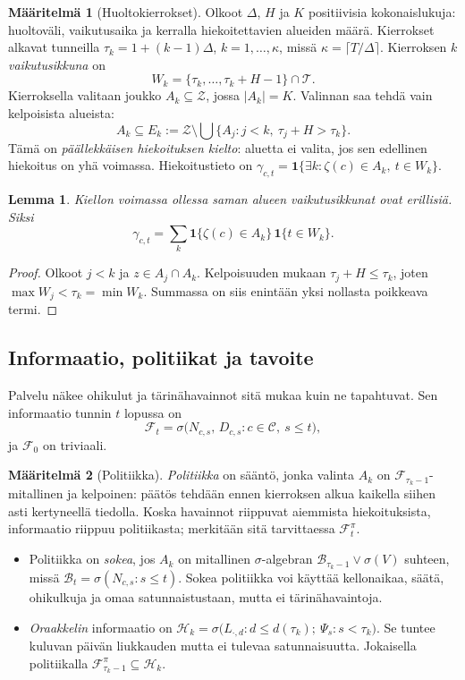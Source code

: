 \documentclass[11pt,a4paper]{article}
\theoremstyle{plain}
\newtheorem{lemma}{Lemma}
\theoremstyle{definition}
\newtheorem{maaritelma}{Määritelmä}
\theoremstyle{remark}
\newcommand{\cC}{\mathcal{C}}
\newcommand{\cZ}{\mathcal{Z}}
\newcommand{\cT}{\mathcal{T}}
\newcommand{\cF}{\mathcal{F}}
\newcommand{\cB}{\mathcal{B}}
\newcommand{\cH}{\mathcal{H}}
\newcommand{\1}{\mathbf{1}}
\begin{document}
\begin{maaritelma}[Huoltokierrokset]\label{maar:huolto}
Olkoot $\Delta$, $H$ ja $K$ positiivisia kokonaislukuja: huoltoväli,
vaikutusaika ja kerralla hiekoitettavien alueiden määrä. Kierrokset alkavat
tunneilla $\tau_k = 1 + (k-1)\Delta$, $k = 1, \dots, \kappa$, missä
$\kappa = \lceil T/\Delta \rceil$. Kierroksen $k$ \emph{vaikutusikkuna} on
\[
  W_k = \{\tau_k, \dots, \tau_k + H - 1\} \cap \cT.
\]
Kierroksella valitaan joukko $A_k \subseteq \cZ$, jossa $|A_k| = K$. Valinnan
saa tehdä vain kelpoisista alueista:
\[
  A_k \subseteq E_k := \cZ \setminus \bigcup\bigl\{A_j : j < k,\ \tau_j + H > \tau_k\bigr\}.
\]
Tämä on \emph{päällekkäisen hiekoituksen kielto}: aluetta ei valita, jos sen
edellinen hiekoitus on yhä voimassa. Hiekoitustieto on
$\gamma_{c,t} = \1\{\exists k : \zeta(c) \in A_k,\ t \in W_k\}$.
\end{maaritelma}

\begin{lemma}\label{le:erilliset}
Kiellon voimassa ollessa saman alueen vaikutusikkunat ovat erillisiä. Siksi
\[
  \gamma_{c,t} = \sum_{k} \1\{\zeta(c) \in A_k\}\, \1\{t \in W_k\}.
\]
\end{lemma}

\begin{proof}
Olkoot $j < k$ ja $z \in A_j \cap A_k$. Kelpoisuuden mukaan $\tau_j + H \le \tau_k$,
joten $\max W_j < \tau_k = \min W_k$. Summassa on siis enintään yksi nollasta
poikkeava termi.
\end{proof}

\subsection{Informaatio, politiikat ja tavoite}

Palvelu näkee ohikulut ja tärinähavainnot sitä mukaa kuin ne tapahtuvat. Sen
informaatio tunnin $t$ lopussa on
\[
  \cF_t = \sigma\bigl(N_{c,s},\, D_{c,s} : c \in \cC,\ s \le t\bigr),
\]
ja $\cF_0$ on triviaali.

\begin{maaritelma}[Politiikka]\label{maar:politiikka}
\emph{Politiikka} on sääntö, jonka valinta $A_k$ on $\cF_{\tau_k - 1}$-mitallinen
ja kelpoinen: päätös tehdään ennen kierroksen alkua kaikella siihen asti
kertyneellä tiedolla. Koska havainnot riippuvat aiemmista hiekoituksista,
informaatio riippuu politiikasta; merkitään sitä tarvittaessa $\cF^\pi_t$.
\begin{itemize}
  \item Politiikka on \emph{sokea}, jos $A_k$ on mitallinen $\sigma$-algebran
  $\cB_{\tau_k - 1} \vee \sigma(V)$ suhteen, missä
  $\cB_t = \sigma(N_{c,s} : s \le t)$. Sokea politiikka voi käyttää kellonaikaa,
  säätä, ohikulkuja ja omaa satunnaistustaan, mutta ei tärinähavaintoja.
  \item \emph{Oraakkelin} informaatio on
  $\cH_k = \sigma\bigl(L_{\cdot,d} : d \le d(\tau_k);\ \Psi_s : s < \tau_k\bigr)$.
  Se tuntee kuluvan päivän liukkauden mutta ei tulevaa satunnaisuutta.
  Jokaisella politiikalla $\cF^\pi_{\tau_k - 1} \subseteq \cH_k$.
\end{itemize}
\end{maaritelma}
\end{document}
